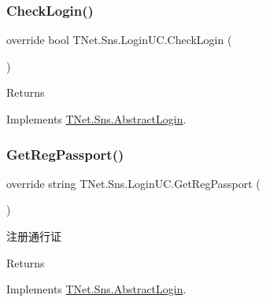 \subsubsection{\texorpdfstring{Check\+Login()}{CheckLogin()}}
{\footnotesize\ttfamily override bool T\+Net.\+Sns.\+Login\+U\+C.\+Check\+Login (\begin{DoxyParamCaption}{ }\end{DoxyParamCaption})\hspace{0.3cm}{\ttfamily [virtual]}}





\begin{DoxyReturn}{Returns}

\end{DoxyReturn}


Implements \mbox{\hyperlink{class_t_net_1_1_sns_1_1_abstract_login_a6b5dac3d6d46efb7b1e4049e674105e5}{T\+Net.\+Sns.\+Abstract\+Login}}.

\mbox{\label{class_t_net_1_1_sns_1_1_login_u_c_a6ba22f5ef4dbee94a5f59020d79f4b58}} 
\subsubsection{\texorpdfstring{Get\+Reg\+Passport()}{GetRegPassport()}}
{\footnotesize\ttfamily override string T\+Net.\+Sns.\+Login\+U\+C.\+Get\+Reg\+Passport (\begin{DoxyParamCaption}{ }\end{DoxyParamCaption})\hspace{0.3cm}{\ttfamily [virtual]}}



注册通行证 

\begin{DoxyReturn}{Returns}

\end{DoxyReturn}


Implements \mbox{\hyperlink{class_t_net_1_1_sns_1_1_abstract_login_a3930eb564bb4804e1b646d749f20907a}{T\+Net.\+Sns.\+Abstract\+Login}}.

\mbox{\label{class_t_net_1_1_sns_1_1_login_u_c_aa485488cbd33676d08c1a72c0a681abc}} 
